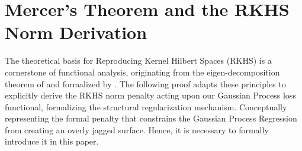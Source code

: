 \documentclass[12pt,oneside]{report}
\theoremstyle{definition}
\theoremstyle{remark}
\begin{document}
\section{Mercer's Theorem and the RKHS Norm Derivation}
\label{sec:m_theorem_b6}

The theoretical basis for Reproducing Kernel Hilbert Spaces (RKHS) is a cornerstone of functional analysis, originating from the eigen-decomposition theorem of \citet{mercer1909functions} and formalized by \citet{aronszajn1950theory}. The following proof adapts these principles to explicitly derive the RKHS norm penalty acting upon our Gaussian Process loss functional, formalizing the structural regularization mechanism. Conceptually representing the formal penalty that constrains the Gaussian Process Regression from creating an overly jagged surface. Hence, it is necessary to formally introduce it in this paper.
\end{document}
